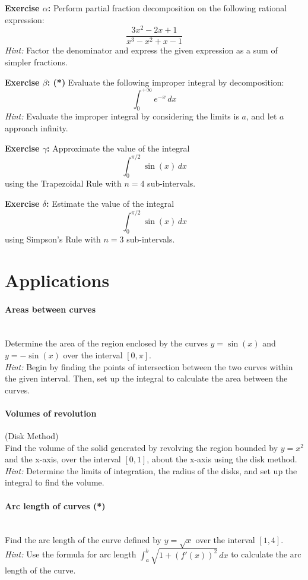 \documentclass[]{article}
\begin{document}
	\textbf{Exercise $\alpha$:}
	Perform partial fraction decomposition on the following rational expression:
	\[
	\frac{3x^2 - 2x + 1}{x^3 - x^2 + x - 1}
	\]
	\textit{Hint:} Factor the denominator and express the given expression as a sum of simpler fractions.
	
	\textbf{Exercise $\beta$: (*)}
	Evaluate the following improper integral by decomposition:
	\[
	\int_0^{+\infty} e^{-x}\, dx
	\]
	\textit{Hint:} Evaluate the improper integral by considering the limits is $a$, and let $a$ approach infinity.
	
	\textbf{Exercise $\gamma$:}
	Approximate the value of the integral
	\[
	\int_0^{\pi/2} \sin(x) \, dx
	\]
	using the Trapezoidal Rule with \(n = 4\) sub-intervals.
	
	\textbf{Exercise $\delta$:}
	Estimate the value of the integral
	\[
	\int_0^{\pi/2} \sin(x) \, dx
	\]
	using Simpson's Rule with \(n = 3\) sub-intervals.
	
	
	\section{Applications}
	\paragraph{Areas between curves}\mbox{}\\
	Determine the area of the region enclosed by the curves \(y = \sin(x)\) and \(y = -\sin(x)\) over the interval \([0, \pi]\).\\
	\textit{Hint:} Begin by finding the points of intersection between the two curves within the given interval.
	Then, set up the integral to calculate the area between the curves.
	
	\paragraph{Volumes of revolution} (Disk Method)\\
	Find the volume of the solid generated by revolving the region bounded by \(y = x^2\) and the x-axis, over the interval \([0, 1]\), about the x-axis using the disk method.\\
	\textit{Hint:} Determine the limits of integration, the radius of the disks, and set up the integral to find the volume.
	
	\paragraph{Arc length of curves (*)}\mbox{}\\
	Find the arc length of the curve defined by \(y = \sqrt{x}\) over the interval \([1, 4]\).\\
	\textit{Hint:} Use the formula for arc length \(\int_a^b \sqrt{1 + (f'(x))^2} \, dx\) to calculate the arc length of the curve.
	
\end{document}
